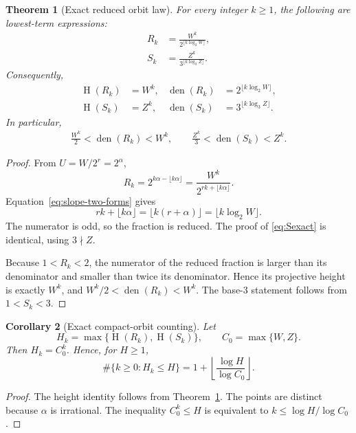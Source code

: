 \documentclass[11pt]{article}
\newtheorem{theorem}{Theorem}[section]
\newtheorem{corollary}[theorem]{Corollary}
\theoremstyle{definition}
\theoremstyle{remark}
\newcommand{\den}{\operatorname{den}}
\newcommand{\Hgt}{\operatorname{H}}
\begin{document}
\begin{theorem}[Exact reduced orbit law]\label{thm:exact-orbit}
For every integer $k\ge1$, the following are lowest-term expressions:
\begin{align}
 R_k&=\frac{W^k}{2^{\lfloor k\log_2W\rfloor}},
 \label{eq:Rexact}\\
 S_k&=\frac{Z^k}{3^{\lfloor k\log_3Z\rfloor}}.
 \label{eq:Sexact}
\end{align}
Consequently,
\begin{align}
 \Hgt(R_k)&=W^k, & \den(R_k)&=2^{\lfloor k\log_2W\rfloor},
 \label{eq:Rheight}\\
 \Hgt(S_k)&=Z^k, & \den(S_k)&=3^{\lfloor k\log_3Z\rfloor}.
 \label{eq:Sheight}
\end{align}
In particular,
\begin{align}
 \frac{W^k}{2}<\den(R_k)<W^k,
 \qquad
 \frac{Z^k}{3}<\den(S_k)<Z^k.
 \label{eq:den-comparable}
\end{align}
\end{theorem}

\begin{proof}
From $U=W/2^r=2^\alpha$,
\[
 R_k=2^{k\alpha-\lfloor k\alpha\rfloor}
     =\frac{W^k}{2^{rk+\lfloor k\alpha\rfloor}}.
\]
Equation~\eqref{eq:slope-two-forms} gives
\[
 rk+\lfloor k\alpha\rfloor
 =\lfloor k(r+\alpha)\rfloor
 =\lfloor k\log_2W\rfloor.
\]
The numerator is odd, so the fraction is reduced.  The proof of
\eqref{eq:Sexact} is identical, using $3\nmid Z$.

Because $1<R_k<2$, the numerator of the reduced fraction is larger than its denominator and
smaller than twice its denominator.  Hence its projective height is exactly $W^k$, and
$W^k/2<\den(R_k)<W^k$.  The base-$3$ statement follows from $1<S_k<3$.
\end{proof}

\begin{corollary}[Exact compact-orbit counting]\label{cor:exact-count}
Let
\[
  H_k=\max\{\Hgt(R_k),\Hgt(S_k)\},
  \qquad C_0=\max\{W,Z\}.
\]
Then $H_k=C_0^k$.  Hence, for $H\ge1$,
\begin{equation}
 \#\{k\ge0:H_k\le H\}
 =1+\left\lfloor\frac{\log H}{\log C_0}\right\rfloor.
 \label{eq:exact-count}
\end{equation}
\end{corollary}

\begin{proof}
The height identity follows from Theorem~\ref{thm:exact-orbit}.  The points are distinct
because $\alpha$ is irrational.  The inequality $C_0^k\le H$ is equivalent to
$k\le\log H/\log C_0$.
\end{proof}
\end{document}
